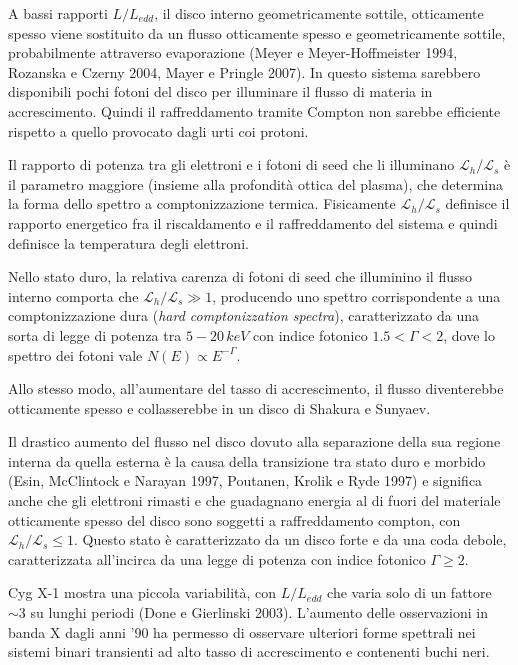 \documentclass[a4paperbi]{article}
\begin{document}
	A bassi rapporti $L/L_{edd}$, il disco interno geometricamente sottile, otticamente spesso viene sostituito da un flusso otticamente spesso e geometricamente sottile, probabilmente attraverso evaporazione (Meyer e Meyer-Hoffmeister 1994, Rozanska e Czerny 2004, Mayer e Pringle 2007). In questo sistema sarebbero disponibili pochi fotoni del disco per illuminare il flusso di materia in accrescimento. Quindi il raffreddamento tramite Compton non sarebbe efficiente rispetto a quello provocato dagli urti coi protoni. 
	
	Il rapporto di potenza tra gli elettroni e i fotoni di seed che li illuminano $\mathcal{L}_h/\mathcal{L}_s$ è il parametro maggiore (insieme alla profondità ottica del plasma), che determina la forma dello spettro a comptonizzazione termica. Fisicamente $\mathcal{L}_h/\mathcal{L}_s$ definisce il rapporto energetico fra il riscaldamento e il raffreddamento del sistema e quindi definisce la temperatura degli elettroni.
	
	Nello stato duro, la relativa carenza di fotoni di seed che illuminino il flusso interno comporta che $\mathcal{L}_h/\mathcal{L}_s\gg1$, producendo uno spettro corrispondente a una comptonizzazione dura (\textit{hard comptonizzation spectra}), caratterizzato da una sorta di legge di potenza tra $5-20\,keV$ con indice fotonico $1.5<\Gamma<2$, dove lo spettro dei fotoni vale $N(E)\propto E^{-\Gamma}$. 
	
	Allo stesso modo, all'aumentare del tasso di accrescimento, il flusso diventerebbe otticamente spesso e collasserebbe in un disco di Shakura e Sunyaev. 
	
	Il drastico aumento del flusso nel disco dovuto alla separazione della sua regione interna da quella esterna è la causa della transizione tra stato duro e morbido (Esin, McClintock e Narayan 1997, Poutanen, Krolik e Ryde 1997) e significa anche che gli elettroni rimasti e che guadagnano energia al di fuori del materiale otticamente spesso del disco sono soggetti a raffreddamento compton, con $\mathcal{L}_h/\mathcal{L}_s\leq1$. Questo stato è caratterizzato da un disco forte e da una coda debole, caratterizzata all'incirca da una legge di potenza con indice fotonico $\Gamma\geq2$.
	
	Cyg X-1 mostra una piccola variabilità, con $L/L_{edd}$ che varia solo di un fattore $\sim3$ su lunghi periodi (Done e Gierlinski 2003). L'aumento delle osservazioni in banda X dagli anni '90 ha permesso di osservare ulteriori forme spettrali nei sistemi binari transienti ad alto tasso di accrescimento e contenenti buchi neri.
	
\end{document}
